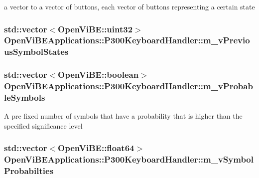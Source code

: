 \label{classOpenViBEApplications_1_1P300KeyboardHandler_a66266cf621af51049274763bff5f1f15}
a vector to a vector of buttons, each vector of buttons representing a certain state \hypertarget{classOpenViBEApplications_1_1P300KeyboardHandler_a3767646cdb49bf416483f9f9455769fe}{
\subsubsection[{m\_\-vPreviousSymbolStates}]{\setlength{\rightskip}{0pt plus 5cm}std::vector$<$OpenViBE::uint32$>$ {\bf OpenViBEApplications::P300KeyboardHandler::m\_\-vPreviousSymbolStates}}}
\label{classOpenViBEApplications_1_1P300KeyboardHandler_a3767646cdb49bf416483f9f9455769fe}
\hypertarget{classOpenViBEApplications_1_1P300KeyboardHandler_ae30854286f16b23de7c72f1549bd5596}{
\subsubsection[{m\_\-vProbableSymbols}]{\setlength{\rightskip}{0pt plus 5cm}std::vector$<$OpenViBE::boolean$>$ {\bf OpenViBEApplications::P300KeyboardHandler::m\_\-vProbableSymbols}}}
\label{classOpenViBEApplications_1_1P300KeyboardHandler_ae30854286f16b23de7c72f1549bd5596}
A pre fixed number of symbols that have a probability that is higher than the specified significance level \hypertarget{classOpenViBEApplications_1_1P300KeyboardHandler_a1ac93ed15de2fd151ec5bfaf5e71a607}{
\subsubsection[{m\_\-vSymbolProbabilties}]{\setlength{\rightskip}{0pt plus 5cm}std::vector$<$OpenViBE::float64$>$ {\bf OpenViBEApplications::P300KeyboardHandler::m\_\-vSymbolProbabilties}}}
